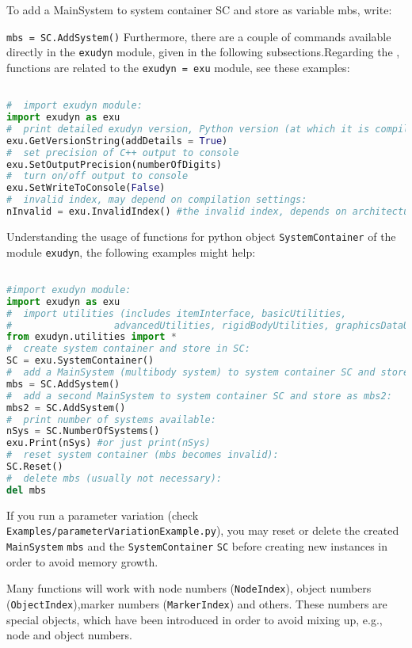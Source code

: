 To add a MainSystem to system container SC and store as variable mbs, write:
\bi
\item[] \texttt{mbs = SC.AddSystem()}
\ei
Furthermore, there are a couple of commands available directly in the \texttt{exudyn} module, given in the following subsections.Regarding the , functions are related to the \texttt{exudyn = exu} module, see these examples:
\pythonstyle
\begin{lstlisting}[language=Python, firstnumber=1]

#  import exudyn module:
import exudyn as exu
#  print detailed exudyn version, Python version (at which it is compiled):
exu.GetVersionString(addDetails = True)
#  set precision of C++ output to console
exu.SetOutputPrecision(numberOfDigits)
#  turn on/off output to console
exu.SetWriteToConsole(False)
#  invalid index, may depend on compilation settings:
nInvalid = exu.InvalidIndex() #the invalid index, depends on architecture and version
\end{lstlisting}


Understanding the usage of functions for python object \texttt{SystemContainer} of the module \texttt{exudyn}, the following examples might help:
\pythonstyle
\begin{lstlisting}[language=Python, firstnumber=1]

#import exudyn module:
import exudyn as exu
#  import utilities (includes itemInterface, basicUtilities, 
#                  advancedUtilities, rigidBodyUtilities, graphicsDataUtilities):
from exudyn.utilities import *
#  create system container and store in SC:
SC = exu.SystemContainer()
#  add a MainSystem (multibody system) to system container SC and store as mbs:
mbs = SC.AddSystem()
#  add a second MainSystem to system container SC and store as mbs2:
mbs2 = SC.AddSystem()
#  print number of systems available:
nSys = SC.NumberOfSystems()
exu.Print(nSys) #or just print(nSys)
#  reset system container (mbs becomes invalid):
SC.Reset()
#  delete mbs (usually not necessary):
del mbs
\end{lstlisting}


If you run a parameter variation (check \texttt{Examples/parameterVariationExample.py}), you may reset or delete the created \texttt{MainSystem} \texttt{mbs} and the \texttt{SystemContainer} \texttt{SC} before creating new instances in order to avoid memory growth.

\label{sec:itemIndex}
Many functions will work with node numbers (\texttt{NodeIndex}), object numbers (\texttt{ObjectIndex}),marker numbers (\texttt{MarkerIndex}) and others. These numbers are special objects, which have been introduced in order to avoid mixing up, e.g., node and object numbers. 

